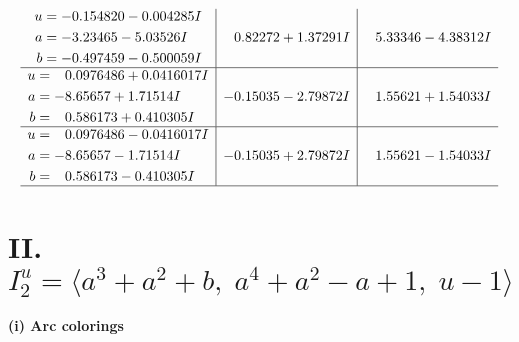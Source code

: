 \documentclass[1p]{elsarticle_modified}
\theoremstyle{definition}
\begin{document}
$$\begin{array}{c|c|c}
\begin{aligned}
u &= -0.154820 - 0.004285 I \\
a &= -3.23465 - 5.03526 I \\
b &= -0.497459 - 0.500059 I\end{aligned}
 & \phantom{-}0.82272 + 1.37291 I & \phantom{-}5.33346 - 4.38312 I \\ \hline\begin{aligned}
u &= \phantom{-}0.0976486 + 0.0416017 I \\
a &= -8.65657 + 1.71514 I \\
b &= \phantom{-}0.586173 + 0.410305 I\end{aligned}
 & -0.15035 - 2.79872 I & \phantom{-}1.55621 + 1.54033 I \\ \hline\begin{aligned}
u &= \phantom{-}0.0976486 - 0.0416017 I \\
a &= -8.65657 - 1.71514 I \\
b &= \phantom{-}0.586173 - 0.410305 I\end{aligned}
 & -0.15035 + 2.79872 I & \phantom{-}1.55621 - 1.54033 I\\
 \hline 
 \end{array}$$\newpage\newpage\renewcommand{\arraystretch}{1}
\centering \section*{II. $I^u_{2}= \langle a^3+a^2+b,\;a^4+a^2- a+1,\;u-1 \rangle$}
\flushleft \textbf{(i) Arc colorings}\\
\end{document}
